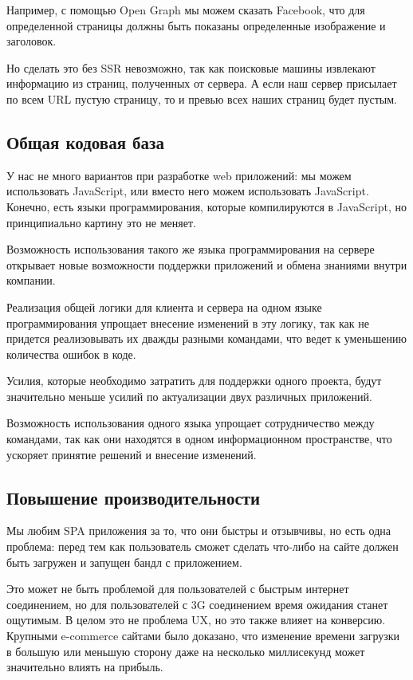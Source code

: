 Например, с помощью Open Graph мы можем сказать Facebook, что для определенной страницы должны быть показаны определенные изображение и заголовок.

Но сделать это без SSR невозможно, так как поисковые машины извлекают информацию из страниц, полученных от сервера. А если наш сервер присылает по всем URL пустую страницу, то и превью всех наших страниц будет пустым.


\subsection{Общая кодовая база}

У нас не много вариантов при разработке web приложений: мы можем использовать JavaScript, или вместо него можем использовать JavaScript. Конечно, есть языки программирования, которые компилируются в JavaScript, но принципиально картину это не меняет.

Возможность использования такого же языка программирования на сервере открывает новые возможности поддержки приложений и обмена знаниями внутри компании. 

Реализация общей логики для клиента и сервера на одном языке программирования упрощает внесение изменений в эту логику, так как не придется реализовывать их дважды разными командами, что ведет к уменьшению количества ошибок в коде. 

Усилия, которые необходимо затратить для поддержки одного проекта, будут значительно меньше усилий по актуализации двух различных приложений.

Возможность использования одного языка упрощает сотрудничество между командами, так как они находятся в одном информационном пространстве, что ускоряет принятие решений и внесение изменений.

\subsection{Повышение производительности}

Мы любим SPA приложения за то, что они быстры и отзывчивы, но есть одна проблема: перед тем как пользователь сможет сделать что-либо на сайте должен быть загружен и запущен бандл с приложением.

Это может не быть проблемой для пользователей с быстрым интернет соединением, но для пользователей с 3G соединением время ожидания станет ощутимым. В целом это не проблема UX, но это также влияет на конверсию. Крупными e-commerce сайтами было доказано, что изменение времени загрузки в большую или меньшую сторону даже на несколько миллисекунд может значительно влиять на прибыль.

